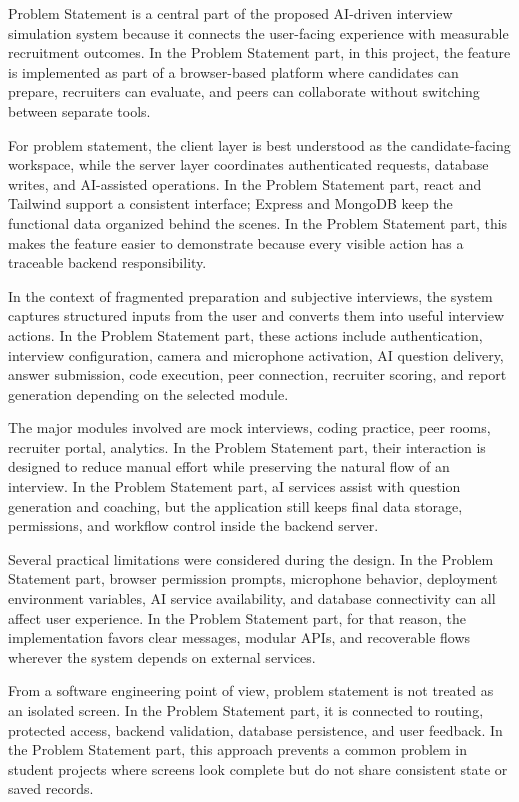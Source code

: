 \documentclass[12pt,a4paper]{report}
\begin{document}
Problem Statement is a central part of the proposed AI-driven interview simulation system because it connects the user-facing experience with measurable recruitment outcomes. In the Problem Statement part, in this project, the feature is implemented as part of a browser-based platform where candidates can prepare, recruiters can evaluate, and peers can collaborate without switching between separate tools.


For problem statement, the client layer is best understood as the candidate-facing workspace, while the server layer coordinates authenticated requests, database writes, and AI-assisted operations. In the Problem Statement part, react and Tailwind support a consistent interface; Express and MongoDB keep the functional data organized behind the scenes. In the Problem Statement part, this makes the feature easier to demonstrate because every visible action has a traceable backend responsibility.


In the context of fragmented preparation and subjective interviews, the system captures structured inputs from the user and converts them into useful interview actions. In the Problem Statement part, these actions include authentication, interview configuration, camera and microphone activation, AI question delivery, answer submission, code execution, peer connection, recruiter scoring, and report generation depending on the selected module.


The major modules involved are mock interviews, coding practice, peer rooms, recruiter portal, analytics. In the Problem Statement part, their interaction is designed to reduce manual effort while preserving the natural flow of an interview. In the Problem Statement part, aI services assist with question generation and coaching, but the application still keeps final data storage, permissions, and workflow control inside the backend server.


Several practical limitations were considered during the design. In the Problem Statement part, browser permission prompts, microphone behavior, deployment environment variables, AI service availability, and database connectivity can all affect user experience. In the Problem Statement part, for that reason, the implementation favors clear messages, modular APIs, and recoverable flows wherever the system depends on external services.


From a software engineering point of view, problem statement is not treated as an isolated screen. In the Problem Statement part, it is connected to routing, protected access, backend validation, database persistence, and user feedback. In the Problem Statement part, this approach prevents a common problem in student projects where screens look complete but do not share consistent state or saved records.
\end{document}
